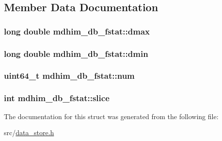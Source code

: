 \subsection{Member Data Documentation}
\hypertarget{structmdhim__db__fstat_a6a955791d2278a8f27816149f294b930}{
\subsubsection[{dmax}]{\setlength{\rightskip}{0pt plus 5cm}long double mdhim\-\_\-db\-\_\-fstat\-::dmax}}\label{structmdhim__db__fstat_a6a955791d2278a8f27816149f294b930}
\hypertarget{structmdhim__db__fstat_a945705f2eeeb829955e11d21a9377b0f}{
\subsubsection[{dmin}]{\setlength{\rightskip}{0pt plus 5cm}long double mdhim\-\_\-db\-\_\-fstat\-::dmin}}\label{structmdhim__db__fstat_a945705f2eeeb829955e11d21a9377b0f}
\hypertarget{structmdhim__db__fstat_a4ce8dc02a9a126e5079a50ba3509a49b}{
\subsubsection[{num}]{\setlength{\rightskip}{0pt plus 5cm}uint64\-\_\-t mdhim\-\_\-db\-\_\-fstat\-::num}}\label{structmdhim__db__fstat_a4ce8dc02a9a126e5079a50ba3509a49b}
\hypertarget{structmdhim__db__fstat_a058b21688809dbc426bf464f967c5bf3}{
\subsubsection[{slice}]{\setlength{\rightskip}{0pt plus 5cm}int mdhim\-\_\-db\-\_\-fstat\-::slice}}\label{structmdhim__db__fstat_a058b21688809dbc426bf464f967c5bf3}


The documentation for this struct was generated from the following file\-:\begin{DoxyCompactItemize}
\item 
src/\hyperlink{data__store_8h}{data\-\_\-store.\-h}\end{DoxyCompactItemize}
